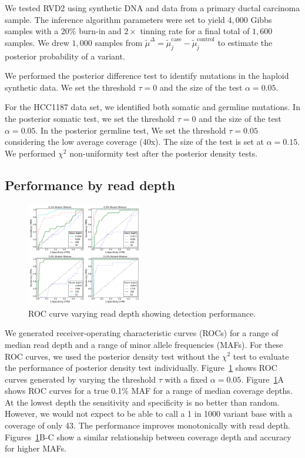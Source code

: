 \documentclass{bioinfo}
\begin{document}
We tested RVD2 using synthetic DNA and data from a primary ductal carcinoma sample. The inference algorithm parameters were set to yield $4,000$ Gibbs samples with a 20\% burn-in and $2\times$ tinning rate for a final total of $1,600$ samples. We drew $1,000$ samples from $ \tilde{\mu}^{\Delta} =  \tilde{\mu}_j^{\text{case}} - \tilde{\mu}_j^{\text{control}}$ to estimate the posterior probability of a variant.

We performed the posterior difference test to identify mutations in the haploid synthetic data. We set the threshold $ \tau =0 $ and the size of the test $ \alpha = 0.05$.

For the HCC1187 data set, we identified both somatic and germline mutations. In the posterior somatic test, we set the threshold $ \tau =0 $ and the size of the test $ \alpha = 0.05$. In the posterior germline test, We set  the threshold $ \tau =0.05 $ considering the low average coverage (40x). The size of the test is set at $ \alpha = 0.15$. We performed $ \chi^2 $ non-uniformity test after the posterior density tests.

\subsection{Performance by read depth}\label{sec:read_depth}

\begin{figure}[htbp]
\centering
\vspace{-15pt}
\includegraphics[width=0.45\textwidth]{pdf_figs/ROC_without_chi2.pdf}
\caption{ROC curve varying read depth showing detection performance. }
\vspace{-15pt}
\label{fig:ROC}
\end{figure}
We generated receiver-operating characteristic curves (ROCs) for a range of median read depth and a range of minor allele frequencies (MAFs). For these ROC curves, we used the posterior density test without the $\chi^2$ test to evaluate the performance of posterior density test individually. Figure~\ref{fig:ROC} shows ROC curves generated by varying the threshold $\tau$ with a fixed $\alpha=0.05$. Figure~\ref{fig:ROC}A shows ROC curves for a true 0.1\% MAF for a range of median coverage depths. At the lowest depth the sensitivity and specificity is no better than random. However, we would not expect to be able to call a 1 in 1000 variant base with a coverage of only 43. The performance improves monotonically with read depth. Figures~\ref{fig:ROC}B-C show a similar relationship between coverage depth and accuracy for higher MAFs.
\end{document}
